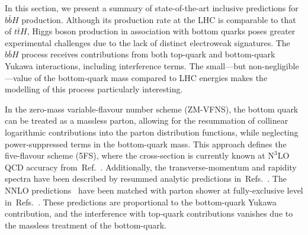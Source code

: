 \newcommand{\bbH}{$b\bar{b}H$}
\newcommand{\citere}[1]{Ref.~\cite{#1}}
\newcommand{\citeres}[1]{Refs.~\cite{#1}}
\newcommand{\tab}[1]{Table \ref{#1}}
\newcommand{\nnnlo}{$\text{N}^3\text{LO}$}
\newcommand{\noun}[1]{{\scshape #1}}
\newcommand{\minnlo}{{\noun{MiNNLO$_{\textrm{PS}}$}}}


In this section, we present a summary of state-of-the-art inclusive predictions for \bbH{} production. Although its production rate at the LHC is comparable to that of $t\bar{t}H$, Higgs boson production in association with bottom quarks poses greater experimental challenges due to the lack of distinct electroweak signatures. The \bbH{} process receives contributions from both top-quark and bottom-quark Yukawa interactions, including interference terms. The small—but non-negligible—value of the bottom-quark mass compared to LHC energies makes the modelling of this process particularly interesting.

In the zero-mass variable-flavour number scheme (ZM-VFNS), the bottom quark can be treated as a massless parton, allowing for the resummation of collinear logarithmic contributions into the parton distribution functions, while neglecting power-suppressed terms in the bottom-quark mass. This approach defines the five-flavour scheme (5FS), where the cross-section is currently known at \nnnlo{} QCD accuracy from~\citere{Duhr:2019kwi}. Additionally, the transverse-momentum and rapidity spectra have been described by resummed analytic predictions in~\citeres{Cal:2023mib,Das:2024pac}. The NNLO predictions~\cite{Harlander:2003ai} have been matched with parton shower at fully-exclusive level in~\citeres{Biello:2024vdh,Gavardi:2025zpf}. These predictions are proportional to the bottom-quark Yukawa contribution, and the interference with top-quark contributions vanishes due to the massless treatment of the bottom-quark.

